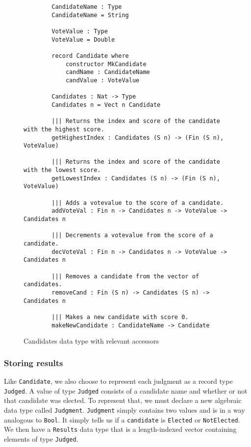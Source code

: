 \begin{figure}[htbp!!!!!!!!!!!!!!]
	\caption{Candidates data type with relevant accessors}
	\label{candidates_code}
	\begin{lstlisting}
        CandidateName : Type
        CandidateName = String

        VoteValue : Type
        VoteValue = Double

        record Candidate where
            constructor MkCandidate
            candName : CandidateName
            candValue : VoteValue
        
        Candidates : Nat -> Type
        Candidates n = Vect n Candidate

        ||| Returns the index and score of the candidate with the highest score. 
        getHighestIndex : Candidates (S n) -> (Fin (S n), VoteValue)

        ||| Returns the index and score of the candidate with the lowest score. 
        getLowestIndex : Candidates (S n) -> (Fin (S n), VoteValue)

        ||| Adds a votevalue to the score of a candidate. 
        addVoteVal : Fin n -> Candidates n -> VoteValue -> Candidates n
        
        ||| Decrements a votevalue from the score of a candidate. 
        decVoteVal : Fin n -> Candidates n -> VoteValue -> Candidates n

        ||| Removes a candidate from the vector of candidates. 
        removeCand : Fin (S n) -> Candidates (S n) -> Candidates n

        ||| Makes a new candidate with score 0. 
        makeNewCandidate : CandidateName -> Candidate
    \end{lstlisting}
\end{figure}

\subsubsection{Storing results}

Like \texttt{Candidate}, we also choose to represent each judgment as a record
type \texttt{Judged}. A value of type \texttt{Judged} consists of a candidate
name and whether or not that candidate was elected. To represent that, we must
declare a new algebraic data type called \texttt{Judgment}. \texttt{Judgment}
simply contains two values and is in a way analogous to \texttt{Bool}. It simply
tells us if a \texttt{candidate} is \texttt{Elected} or \texttt{NotElected}. We
then have a \texttt{Results} data type that is a length-indexed vector
containing elements of type \texttt{Judged}. 

